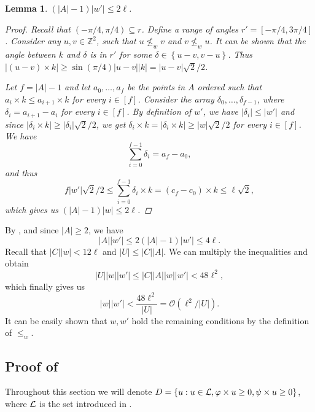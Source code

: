 \documentclass[11pt]{article}
\newcommand{\Z}{\mathbb{Z}}
\renewcommand{\O}{\mathcal{O}}
\newcommand{\set}[1]{\left\lbrace #1 \right\rbrace}
\theoremstyle{plain}
\newtheorem{lemma}{Lemma}
\theoremstyle{definition}
\theoremstyle{remark}
\begin{document}
\begin{lemma}\label{A_ineq}
	$(|A| - 1) |w'| \le 2\ell$. 
	\begin{proof}
		Recall that $(-\pi / 4, \pi / 4) \subseteq r$.
		Define a range of angles $r' = [-\pi / 4, 3\pi / 4]$.
		Consider any $u, v \in \Z^2$, such that $u \not \le_w v$ and $v \not \le_w u$.
		It can be shown that the angle between $k$ and $\delta$ is in $r'$ for some $\delta \in \set{u - v, v - u}$.
		Thus $|(u - v) \times k| \ge \sin(\pi / 4) |u - v||k| = |u - v|\sqrt{2} / 2$.
		
		Let $f = |A| - 1$ and let $a_0, \dots, a_{f}$ be the points in $A$ ordered such that $a_i \times k \le a_{i + 1} \times k$ for every $i \in [f]$.
		Consider the array $\delta_0, \dots, \delta_{f - 1}$, where $\delta_i = a_{i + 1} - a_i$ for every $i \in [f]$.
		By definition of $w'$, we have $|\delta_i| \le |w'|$ and since $|\delta_i \times k| \ge |\delta_i|\sqrt{2} / 2$, we get $\delta_i \times k = |\delta_i \times k| \ge |w| \sqrt{2} / 2$ for every $i \in [f]$.
		We have
		$$ \sum_{i = 0}^{f - 1} \delta_i = a_f - a_0,$$
		and thus
		$$ f|w'| \sqrt{2}/2 \le \sum_{i = 0}^{f - 1} \delta_i \times k = (c_f - c_0) \times k \le \ell \sqrt{2}, $$
		which gives us $(|A| - 1)|w| \le 2\ell$.
	\end{proof}
\end{lemma}

By , and since $|A| \ge 2$, we have
$$|A||w'| \le 2(|A| - 1) |w'| \le 4\ell.$$
Recall that $|C||w| < 12\ell$ and $|U| \le |C| |A|$. We can multiply the inequalities and obtain
$$ |U||w||w'| \le |C||A||w||w'| < 48 \ell^2,$$
which finally gives us
$$|w||w'| < \frac{48\ell^2}{|U|} = \O(\ell^2 / |U|). $$
It can be easily shown that $w, w'$ hold the remaining conditions by the definition of $\le_w$.


\newcommand{\W}{\mathcal{W}}
\subsection{Proof of } \label{subparquet_convolution_proof}
Throughout this section we will denote $D = \set{u : u \in \L, \h{u} \ge 0, \s{u} \ge 0}$, where $\mathcal{L}$ is the set introduced in .
\end{document}
